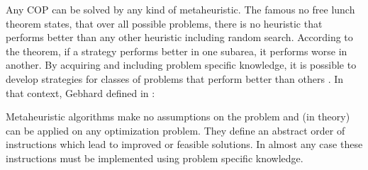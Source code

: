 Any COP can be solved by any kind of metaheuristic. The famous no free lunch theorem \cite{wolpert-97} states, that over all possible problems, there is no heuristic that performs better than any other heuristic including random search. According to the theorem, if a strategy performs better in one subarea, it performs worse in another. By acquiring and including problem specific knowledge, it is possible to develop strategies for classes of problems that perform better than others \cite{chiong-09}. In that context, Gebhard defined in \cite{gebhard-12}:
\begin{definition}
Metaheuristic algorithms make no assumptions on the problem and (in theory) can be applied on any optimization problem. They define an abstract order of instructions which lead to improved or feasible solutions. In almost any case these instructions must be implemented using problem specific knowledge.
\end{definition}
